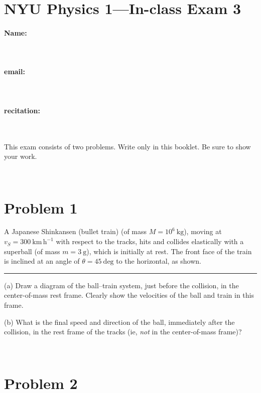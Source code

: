 \documentclass[12pt]{article}
\begin{document}
\section*{NYU Physics 1---In-class Exam 3}

\vfill

\paragraph{Name:} ~

\paragraph{email:} ~

\paragraph{recitation:} ~

\vfill

This exam consists of two problems.  Write only in this booklet.  Be
sure to show your work.

\vfill ~

\clearpage

\section*{Problem 1}

A Japanese Shinkansen (bullet train) (of mass $M=10^6~\mathrm{kg}$),
moving at $v_S=300~\mathrm{km\,h^{-1}}$ with respect to the tracks,
hits and collides elastically with a superball (of mass
$m=3~\mathrm{g}$), which is initially at rest.  The front face of the
train is inclined at an angle of $\theta=45~\mathrm{deg}$ to the
horizontal, as shown.
\\ \rule{0.1\textwidth}{0pt}

(a) Draw a diagram of the ball--train system, just before the
collision, in the center-of-mass rest frame.  Clearly show the
velocities of the ball and train in this frame.

\vfill

(b) What is the final speed and direction of the ball, immediately
after the collision, in the rest frame of the tracks (ie, \emph{not}
in the center-of-mass frame)?

\vfill ~

\clearpage

\section*{Problem 2}
\end{document}
